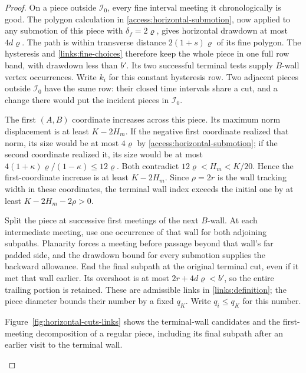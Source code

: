 \begin{proof}
On a piece outside \(\mathcal I_0\), every fine interval meeting it
chronologically is good. The polygon calculation in
\eqref{access:horizontal-submotion}, now applied to any
submotion of this piece with \(\delta_f=2\varrho\), gives horizontal
drawdown at most \(4d\varrho\). The path is within transverse distance
\(2(1+s)\varrho\) of its fine polygon. The hysteresis and
\eqref{links:fine-choices} therefore keep the whole piece in one full
row band, with drawdown less than \(b'\). Its two successful terminal
tests supply \(B\)-wall vertex occurrences.
Write \(k_i\) for this constant hysteresis row. Two adjacent pieces
outside \(\mathcal I_0\) have the same row: their closed time intervals
share a cut, and a change there would put the incident pieces in
\(\mathcal I_0\).

The first \((A,B)\) coordinate increases across this piece. Its
maximum norm displacement is at least \(K-2H_m\). If the negative
first coordinate realized that norm, its size would be at most
\(4\varrho\) by \eqref{access:horizontal-submotion}; if the second
coordinate realized it, its size would be at most
\(4(1+\kappa)\varrho/(1-\kappa)\le12\varrho\).
Both contradict \(12\varrho<H_m<K/20\). Hence the first-coordinate
increase is at least \(K-2H_m\). Since \(\rho=2r\) is the wall tracking
width in these coordinates, the terminal wall index exceeds the initial
one by at least \(K-2H_m-2\rho>0\).

Split the piece at successive first meetings of the next \(B\)-wall.
At each intermediate meeting, use one occurrence of that wall for both
adjoining subpaths.
Planarity forces a meeting before passage beyond that wall's far
padded side, and the drawdown bound for every submotion supplies the
backward allowance. End the final subpath at the original terminal cut,
even if it met that wall earlier. Its overshoot is at most \(2r+4d\varrho<b'\),
so the entire trailing portion is retained. These are admissible links
in \eqref{links:definition}; the piece diameter bounds their number
by a fixed \(q_K\). Write \(q_i\le q_K\) for this number.

Figure~\ref{fig:horizontal-cuts-links} shows the terminal-wall candidates
and the first-meeting decomposition of a regular piece, including its
final subpath after an earlier visit to the terminal wall.

\begin{figure}[t]
\centering
\begin{tikzpicture}[x=1cm,y=1cm,>=Latex,
  every node/.style={font=\scriptsize},
  path trace/.style={draw=black,line width=1pt},
  fine polygon/.style={draw=black!65,dashed,line width=.6pt},
  wall/.style={draw=black!60,line width=.55pt},
  wall strip/.style={fill=black!7,draw=black!22,line width=.3pt},
  support/.style={draw=black!65,densely dotted,line width=.55pt},
  cut/.style={circle,fill=black,inner sep=1.3pt}]


\end{tikzpicture}
\end{figure}
\end{proof}
